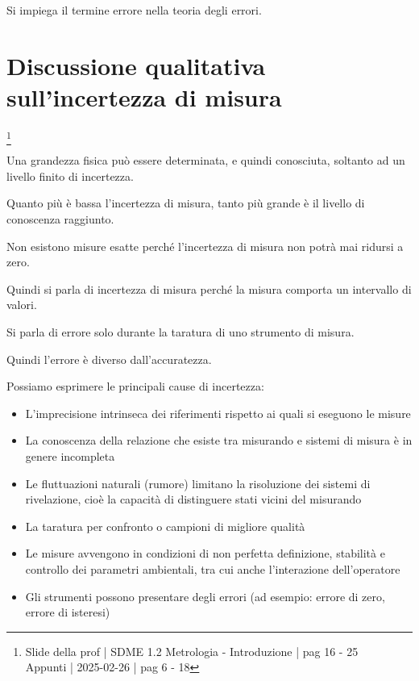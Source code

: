 Si impiega il termine errore nella teoria degli errori. \newline 

\newpage 

\section{Discussione qualitativa sull'incertezza di misura}
\footnote{Slide della prof | SDME 1.2 Metrologia - Introduzione | pag 16 - 25 \\  
Appunti | 2025-02-26 | pag 6 - 18}

Una grandezza fisica può essere determinata, e quindi conosciuta, soltanto ad un livello finito di incertezza. \newline 

Quanto più è bassa l'incertezza di misura, tanto più grande è il livello di conoscenza raggiunto. \newline 

Non esistono misure esatte perché l'incertezza di misura non potrà mai ridursi a zero. \newline 

Quindi si parla di incertezza di misura perché la misura comporta un intervallo di valori. \newline 

Si parla di errore solo durante la taratura di uno strumento di misura. \newline 

Quindi l'errore è diverso dall'accuratezza. \newline 

Possiamo esprimere le principali cause di incertezza: 

\begin{itemize}
    \item L'imprecisione intrinseca dei riferimenti rispetto ai quali si eseguono le misure 
    \item La conoscenza della relazione che esiste tra misurando e sistemi di misura è in genere incompleta 
    \item Le fluttuazioni naturali (rumore) limitano la risoluzione dei sistemi di rivelazione, cioè la capacità di distinguere stati vicini del misurando 
    \item La taratura per confronto o campioni di migliore qualità 
    \item Le misure avvengono in condizioni di non perfetta definizione, stabilità e controllo dei parametri ambientali, tra cui anche l'interazione dell'operatore 
    \item Gli strumenti possono presentare degli errori (ad esempio: errore di zero, errore di isteresi) 
\end{itemize}

